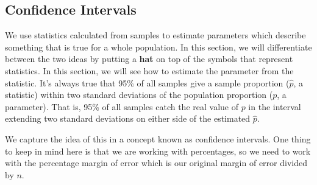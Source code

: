 \subsection{Confidence Intervals}
We use statistics calculated from samples to estimate parameters which describe something that is true for a whole population.  In this section, we will differentiate between the two ideas by putting a \textbf{hat} on top of the symbols that represent statistics. In this section, we will see how to estimate the parameter from the statistic. It's always true that 95\% of all samples give a sample proportion ($\hat p$, a statistic) within two standard deviations of the population proportion ($p$, a parameter). That is, 95\% of all samples catch the real value of $p$ in the interval extending two standard deviations on either side of the estimated $\hat p$. 

We capture the idea of this in a concept known as confidence intervals.  One thing to keep in mind here is that we are working with percentages, so we need to work with the percentage margin of error which is our original margin of error divided by $n$.

